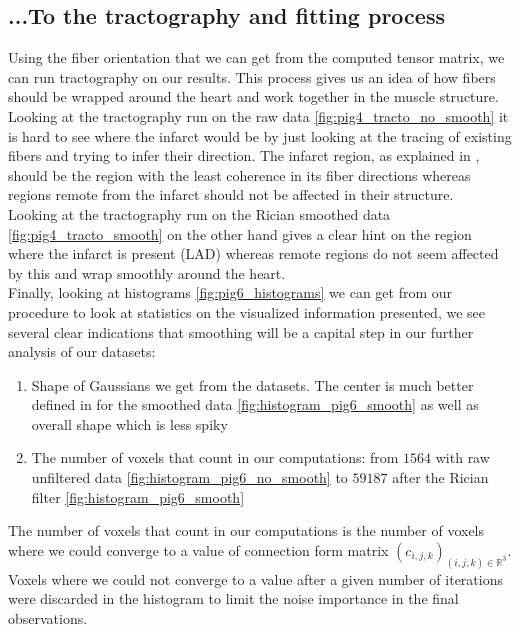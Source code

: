 \subsection{...To the tractography and fitting process}

Using the fiber orientation that we can get from the computed tensor matrix, we can run tractography on our results. This process gives us an idea of how fibers should be wrapped around the heart and work together in the muscle structure. Looking at the tractography run on the raw data \ref{fig:pig4_tracto_no_smooth} it is hard to see where the infarct would be by just looking at the tracing of existing fibers and trying to infer their direction. The infarct region, as explained in \cite{wu2007mr}, should be the region with the least coherence in its fiber directions whereas regions remote from the infarct should not be affected in their structure.\\
Looking at the tractography run on the Rician smoothed data \ref{fig:pig4_tracto_smooth} on the other hand gives a clear hint on the region where the infarct is present (LAD) whereas remote regions do not seem affected by this and wrap smoothly around the heart.\\
Finally, looking at histograms \ref{fig:pig6_histograms} we can get from our procedure to look at statistics on the visualized information presented, we see several clear indications that smoothing will be a capital step in our further analysis of our datasets:
\begin{enumerate}
    \item Shape of Gaussians we get from the datasets. The center is much better defined in for the smoothed data \ref{fig:histogram_pig6_smooth} as well as overall shape which is less spiky
    \item The number of voxels that count in our computations: from $1564$ with raw unfiltered data \ref{fig:histogram_pig6_no_smooth} to $59187$ after the Rician filter \ref{fig:histogram_pig6_smooth}
\end{enumerate}
The number of voxels that count in our computations is the number of voxels where we could converge to a value of connection form matrix $(c_{i, j, k})_{(i, j, k) \in \mathbb{R}^3}$. Voxels where we could not converge to a value after a given number of iterations were discarded in the histogram to limit the noise importance in the final observations.

